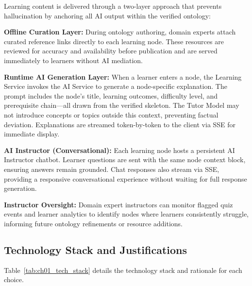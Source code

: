 Learning content is delivered through a two-layer approach that prevents hallucination by anchoring all AI output within the verified ontology:

\textbf{Offline Curation Layer:} During ontology authoring, domain experts attach curated reference links directly to each learning node. These resources are reviewed for accuracy and availability before publication and are served immediately to learners without AI mediation.

\textbf{Runtime AI Generation Layer:} When a learner enters a node, the Learning Service invokes the AI Service to generate a node-specific explanation. The prompt includes the node's title, learning outcomes, difficulty level, and prerequisite chain---all drawn from the verified skeleton. The Tutor Model may not introduce concepts or topics outside this context, preventing factual deviation. Explanations are streamed token-by-token to the client via SSE for immediate display.

\textbf{AI Instructor (Conversational):} Each learning node hosts a persistent AI Instructor chatbot. Learner questions are sent with the same node context block, ensuring answers remain grounded. Chat responses also stream via SSE, providing a responsive conversational experience without waiting for full response generation.

\textbf{Instructor Oversight:} Domain expert instructors can monitor flagged quiz events and learner analytics to identify nodes where learners consistently struggle, informing future ontology refinements or resource additions.

\subsection{Technology Stack and Justifications}

Table~\ref{tab:ch01_tech_stack} details the technology stack and rationale for each choice.


